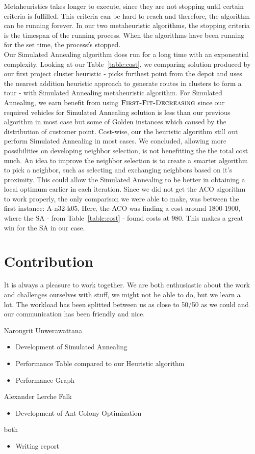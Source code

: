 \documentclass[12pt]{article}
\begin{document}
Metaheuristics takes longer to execute, since they are not stopping until certain criteria is fulfilled. This criteria can be hard to reach and therefore, 
the algorithm can be running forever. In our two metaheuristic algorithms, the stopping criteria is the timespan of the running process. When the algorithms have been running for the set time, the process\' is stopped. \\
Our Simulated Annealing algorithm does run for a long time with an exponential complexity. Looking at our Table~\ref{table:cost}, we comparing solution produced by our first project cluster heuristic - picks furthest point from the depot and uses the nearest addition heuristic approach to generate routes in clusters to form a tour - with Simulated Annealing metaheuristic algorithm. For Simulated Annealing, we earn benefit from using $\textsc{First-Fit-Decreasing}$ since our required vehicles for Simulated Annealing solution is less than our previous algorithm in most case but some of Golden instances which caused by the distribution of customer point. Cost-wise, our the heuristic algorithm still out perform Simulated Annealing in most cases. We concluded, allowing more possibilities on developing neighbor selection, is not benefitting the the total cost much. An idea to improve the neighbor selection is to create a smarter algorithm to pick a neighbor, such as selecting and exchanging neighbors based on it's proximity. This could allow the Simulated Annealing to be better in obtaining a local optimum earlier in each iteration. 
Since we did not get the ACO algorithm to work properly, the only comparison we were able to make, was between the first instance: A-n32-k05. Here, the ACO was finding a cost around 1800-1900, where the SA - from Table~\ref{table:cost} - found costs at 980. This makes a great win for the SA in our case.
\newpage
\section{Contribution}
It is always a pleasure to work together. We are both enthusiastic about the work and challenges ourselves with stuff, we might not be able to do, but we learn a lot. 
The workload has been splitted between us as close to 50/50 as we could and our communication has been friendly and nice. 

Narongrit Unwerawattana
\begin{itemize}
	\item Development of Simulated Annealing
	\item Performance Table compared to our Heuristic algorithm
	\item Performance Graph
\end{itemize}
Alexander Lerche Falk
\begin{itemize}
	\item Development of Ant Colony Optimization
\end{itemize}
both
\begin{itemize}
	\item Writing report
\end{itemize}



\end{document}
